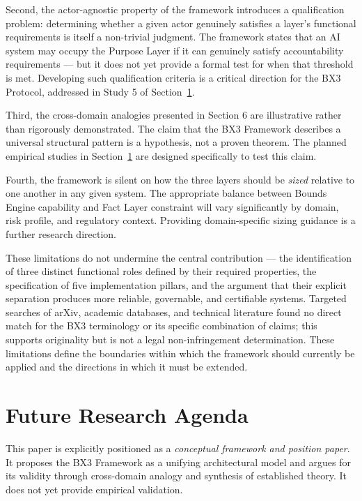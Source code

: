 \documentclass[12pt]{article}
\begin{document}
Second, the actor-agnostic property of the framework introduces a qualification problem: determining whether a given actor genuinely satisfies a layer's functional requirements is itself a non-trivial judgment. The framework states that an AI system may occupy the Purpose Layer if it can genuinely satisfy accountability requirements --- but it does not yet provide a formal test for when that threshold is met. Developing such qualification criteria is a critical direction for the BX3 Protocol, addressed in Study 5 of Section~\ref{sec:research}.

Third, the cross-domain analogies presented in Section 6 are illustrative rather than rigorously demonstrated. The claim that the BX3 Framework describes a universal structural pattern is a hypothesis, not a proven theorem. The planned empirical studies in Section~\ref{sec:research} are designed specifically to test this claim.

Fourth, the framework is silent on how the three layers should be \textit{sized} relative to one another in any given system. The appropriate balance between Bounds Engine capability and Fact Layer constraint will vary significantly by domain, risk profile, and regulatory context. Providing domain-specific sizing guidance is a further research direction.

These limitations do not undermine the central contribution --- the identification of three distinct functional roles defined by their required properties, the specification of five implementation pillars, and the argument that their explicit separation produces more reliable, governable, and certifiable systems. Targeted searches of arXiv, academic databases, and technical literature found no direct match for the BX3 terminology or its specific combination of claims; this supports originality but is not a legal non-infringement determination. These limitations define the boundaries within which the framework should currently be applied and the directions in which it must be extended.

\section{Future Research Agenda}
\label{sec:research}

This paper is explicitly positioned as a \textit{conceptual framework and position paper}. It proposes the BX3 Framework as a unifying architectural model and argues for its validity through cross-domain analogy and synthesis of established theory. It does not yet provide empirical validation.
\end{document}
